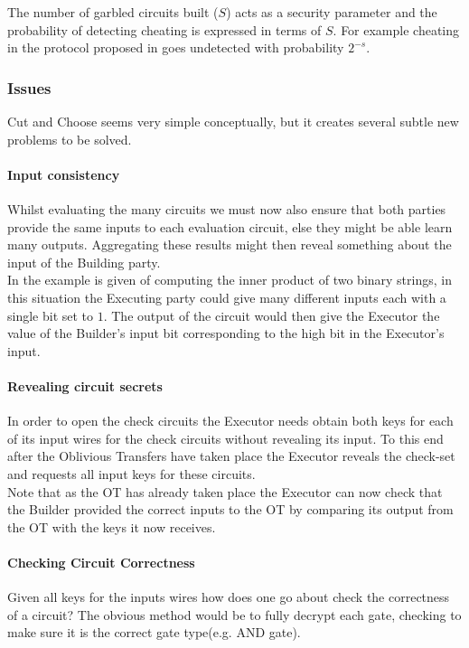 \documentclass[ %
                    author={Nicholas Tutte},
                supervisor={Prof. Nigel Smart},
                    degree={MEng},
                     title={Secure Two Party Computation},
                  subtitle={A practical comparison of recent protocols},
                      type={Research - GG1K},
                      year={2015} ]{dissertation}
\begin{document}
				The number of garbled circuits built ($S$) acts as a security parameter and the probability of detecting cheating is expressed in terms of $S$. For example cheating in the protocol proposed in \cite{Lindell_CnC_2013} goes undetected with probability $2^{-s}$.

			\subsubsection{Issues}
				Cut and Choose seems very simple conceptually, but it creates several subtle new problems to be solved.

				\paragraph{Input consistency} Whilst evaluating the many circuits we must now also ensure that both parties provide the same inputs to each evaluation  circuit, else they might be able learn many outputs. Aggregating these results might then reveal something about the input of the Building party.\\

				In \cite{LindellAndPinkas2007} the example is given of computing the inner product of two binary strings, in this situation the Executing party could give many different inputs each with a single bit set to $1$. The output of the circuit would then give the Executor the value of the Builder's input bit corresponding to the high bit in the Executor's input.

				\paragraph{Revealing circuit secrets}In order to open the check circuits the Executor needs obtain both keys for each of its input wires for the check circuits without revealing its input. To this end after the Oblivious Transfers have taken place the Executor reveals the check-set and requests all input keys for these circuits.\\

				Note that as the OT has already taken place the Executor can now check that the Builder provided the correct inputs to the OT by comparing its output from the OT with the keys it now receives.

				\paragraph{Checking Circuit Correctness}Given all keys for the inputs wires how does one go about check the correctness of a circuit? The obvious method would be to fully decrypt each gate, checking to make sure it is the correct gate type(e.g. AND gate).\\
\end{document}
